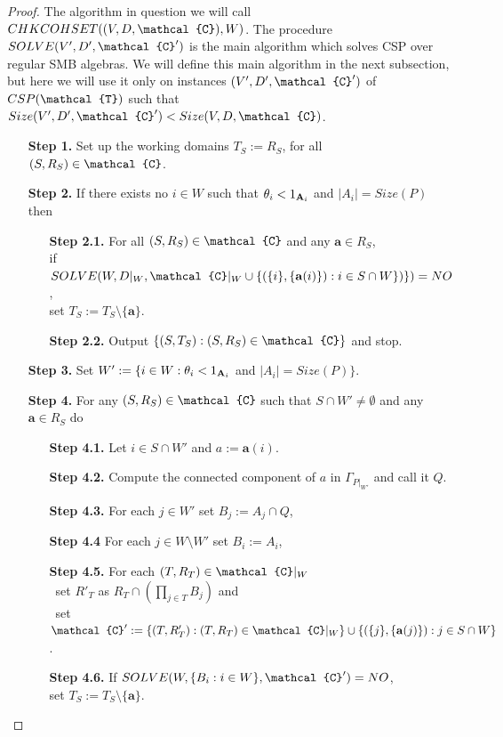 \documentclass[11pt]{amsart}
\newcommand{\m}[1]{{\uppercase {\mathbf {#1}}}}
\newcommand{\vr}[1]{{\uppercase {\mathcal{#1}}}}
\theoremstyle{definition}
\begin{document}
\begin{proof}
The algorithm in question we will call $CHKCOHSET((V,D,\vr c),W)$. The procedure $SOLVE(V',D',\vr c')$ is the main algorithm which solves CSP over regular SMB algebras. We will define this main algorithm in the next subsection, but here we will use it only on instances $(V',D',\vr c')$ of $CSP(\vr t)$ such that $Size(V',D',\vr c')<Size(V,D,\vr c)$. 
\begin{enumerate}
\item[{\bf Step 1.}] Set up the working domains $T_S:=R_S$, for all $(S,R_S)\in \vr c$.
\item[{\bf Step 2.}] If there exists no $i\in W$ such that $\theta_i<1_{\m a_i}$ and $|A_i|=Size(P)$ then
\begin{enumerate}
\item[{\bf Step 2.1.}] For all $(S,R_S)\in \vr c$ and any $\mathbf{a}\in R_S$,\\ if $SOLVE(W,D|_W,\vr c|_W\cup\{(\{i\},\{\mathbf{a}(i)\}):i\in S\cap W\})\})=NO$,\\ set $T_S:=T_S\setminus\{\mathbf{a}\}$.
\item[{\bf Step 2.2.}] Output $\{(S,T_S):(S,R_S)\in\vr c\}$ and stop.
\end{enumerate}
\item[{\bf Step 3.}] Set $W':=\{i\in W:\theta_i<1_{\m a_i}$ and $|A_i|=Size(P)\}$.
\item[{\bf Step 4.}] For any $(S,R_S)\in\vr c$ such that $S\cap W'\neq\emptyset$ and any $\mathbf{a}\in R_S$ do
\begin{enumerate}
\item[{\bf Step 4.1.}] Let $i\in S\cap W'$ and $a:=\mathbf{a}(i)$.
\item[{\bf Step 4.2.}] Compute the connected component of $a$ in $\Gamma_{P|_{W'}}$ and call it $Q$.
\item[{\bf Step 4.3.}] For each $j\in W'$ set $B_j:=A_j\cap Q$,
\item[{\bf Step 4.4}] For each $j\in W\setminus W'$ set $B_i:=A_i$,
\item[{\bf Step 4.5.}] For each $(T,R_T)\in\vr c|_W$\\
\mbox{ }\hspace{-0.7cm}set $R'_T$ as $R_T\cap(\prod_{j\in T}B_j)$ and\\
\mbox{ }\hspace{-0.7cm}set $\vr c':=\{(T,R'_T):(T,R_T)\in\vr c|_W\}\cup\{(\{j\},\{\mathbf{a}(j)\}):j\in S\cap W\}$.
\item[{\bf Step 4.6.}] If $SOLVE(W,\{B_i:i\in W\},\vr c')=NO$,\\ set $T_S:=T_S\setminus\{\mathbf{a}\}$.

\end{enumerate}
\end{enumerate}
\end{proof}
\end{document}
